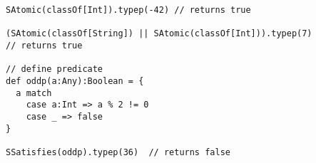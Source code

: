 \begin{lstlisting}[style=scalaioScala]
SAtomic(classOf[Int]).typep(-42) // returns true

(SAtomic(classOf[String]) || SAtomic(classOf[Int])).typep(7) 
// returns true

// define predicate
def oddp(a:Any):Boolean = {
  a match
    case a:Int => a % 2 != 0
    case _ => false
}

SSatisfies(oddp).typep(36)  // returns false
\end{lstlisting}

